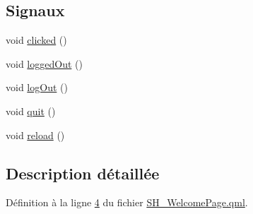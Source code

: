 \subsection*{Signaux}
\begin{DoxyCompactItemize}
\item 
void \hyperlink{classSH__WelcomePage_ade32805350cd52bc84195cd3f5e2d842}{clicked} ()
\item 
void \hyperlink{classSH__WelcomePage_a0d6f94c400b567418f49fce4eab0fa2a}{logged\-Out} ()
\item 
void \hyperlink{classSH__WelcomePage_a5393010ddb7d9a8fba6486d979a0cf38}{log\-Out} ()
\item 
void \hyperlink{classSH__WelcomePage_add4c38249bbc1cdf0d3ff7aed9049a6f}{quit} ()
\item 
void \hyperlink{classSH__WelcomePage_aa839ab56913f730ddd457e14fca1adf3}{reload} ()
\end{DoxyCompactItemize}


\subsection{Description détaillée}


Définition à la ligne \hyperlink{SH__WelcomePage_8qml_source_l00004}{4} du fichier \hyperlink{SH__WelcomePage_8qml_source}{S\-H\-\_\-\-Welcome\-Page.\-qml}.



